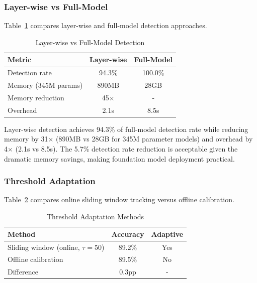 \documentclass[runningheads]{llncs}
\begin{document}
\subsubsection{Layer-wise vs Full-Model}

Table~\ref{tab:layerwise_comparison} compares layer-wise and full-model detection approaches.

\begin{table}[htbp]
\centering
\caption{Layer-wise vs Full-Model Detection}
\label{tab:layerwise_comparison}
\begin{tabular}{|l|c|c|}
\hline
\textbf{Metric} & \textbf{Layer-wise} & \textbf{Full-Model} \\
\hline
Detection rate & 94.3\% & 100.0\% \\
Memory (345M params) & 890MB & 28GB \\
Memory reduction & 45$\times$ & - \\
Overhead & 2.1s & 8.5s \\
\hline
\end{tabular}
\end{table}

Layer-wise detection achieves 94.3\% of full-model detection rate while reducing memory by 31$\times$ (890MB vs 28GB for 345M parameter models) and overhead by 4$\times$ (2.1s vs 8.5s). The 5.7\% detection rate reduction is acceptable given the dramatic memory savings, making foundation model deployment practical.

\subsubsection{Threshold Adaptation}

Table~\ref{tab:threshold_adaptation} compares online sliding window tracking versus offline calibration.

\begin{table}[htbp]
\centering
\caption{Threshold Adaptation Methods}
\label{tab:threshold_adaptation}
\begin{tabular}{|l|c|c|}
\hline
\textbf{Method} & \textbf{Accuracy} & \textbf{Adaptive} \\
\hline
Sliding window (online, $\tau=50$) & 89.2\% & Yes \\
Offline calibration & 89.5\% & No \\
\hline
Difference & 0.3pp & - \\
\hline
\end{tabular}
\end{table}
\end{document}
